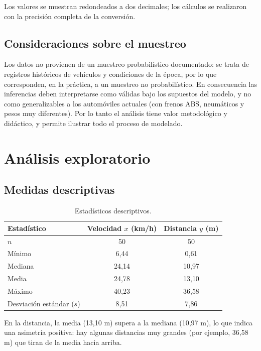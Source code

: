 \documentclass[12pt,a4paper]{article}
\begin{document}
Los valores se muestran redondeados a dos decimales; los cálculos se realizaron con la precisión completa de la conversión.

\subsection{Consideraciones sobre el muestreo}

Los datos no provienen de un muestreo probabilístico documentado: se trata de registros históricos de vehículos y condiciones de la época, por lo que corresponden, en la práctica, a un muestreo no probabilístico. En consecuencia las inferencias deben interpretarse como válidas bajo los supuestos del modelo, y no como generalizables a los automóviles actuales (con frenos ABS, neumáticos y pesos muy diferentes). Por lo tanto el análisis tiene valor metodológico y didáctico, y permite ilustrar todo el proceso de modelado.

\section{Análisis exploratorio}

\subsection{Medidas descriptivas}

\begin{table}[H]
\centering
\caption{Estadísticos descriptivos.}
\begin{tabular}{lcc}
\toprule
\textbf{Estadístico} & \textbf{Velocidad $x$ (km/h)} & \textbf{Distancia $y$ (m)} \\
\midrule
$n$ & 50 & 50 \\
Mínimo & 6{,}44 & 0{,}61 \\
Mediana & 24{,}14 & 10{,}97 \\
Media & 24{,}78 & 13{,}10 \\
Máximo & 40{,}23 & 36{,}58 \\
Desviación estándar ($s$) & 8{,}51 & 7{,}86 \\
\bottomrule
\end{tabular}
\end{table}

En la distancia, la media (13{,}10 m) supera a la mediana (10{,}97 m), lo que indica una asimetría positiva: hay algunas distancias muy grandes (por ejemplo, 36{,}58 m) que tiran de la media hacia arriba.
\end{document}
